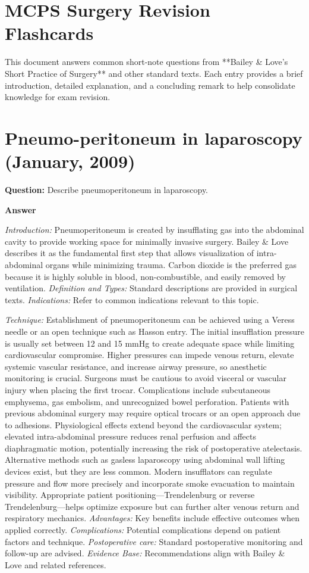 \documentclass{article}
\begin{document}
\section*{MCPS Surgery Revision Flashcards}

This document answers common short-note questions from **Bailey & Love's Short Practice of Surgery** and other standard texts. Each entry provides a brief introduction, detailed explanation, and a concluding remark to help consolidate knowledge for exam revision.


\section{Pneumo-peritoneum in laparoscopy (January, 2009)}

\textbf{Question:} Describe pneumoperitoneum in laparoscopy.

\textbf{Answer}

\emph{Introduction:} Pneumoperitoneum is created by insufflating gas into the abdominal cavity to provide working space for minimally invasive surgery. Bailey & Love describes it as the fundamental first step that allows visualization of intra-abdominal organs while minimizing trauma. Carbon dioxide is the preferred gas because it is highly soluble in blood, non-combustible, and easily removed by ventilation.
\emph{Definition and Types:} Standard descriptions are provided in surgical texts.
\emph{Indications:} Refer to common indications relevant to this topic.

\emph{Technique:} Establishment of pneumoperitoneum can be achieved using a Veress needle or an open technique such as Hasson entry. The initial insufflation pressure is usually set between 12 and 15 mmHg to create adequate space while limiting cardiovascular compromise. Higher pressures can impede venous return, elevate systemic vascular resistance, and increase airway pressure, so anesthetic monitoring is crucial. Surgeons must be cautious to avoid visceral or vascular injury when placing the first trocar. Complications include subcutaneous emphysema, gas embolism, and unrecognized bowel perforation. Patients with previous abdominal surgery may require optical trocars or an open approach due to adhesions. Physiological effects extend beyond the cardiovascular system; elevated intra-abdominal pressure reduces renal perfusion and affects diaphragmatic motion, potentially increasing the risk of postoperative atelectasis. Alternative methods such as gasless laparoscopy using abdominal wall lifting devices exist, but they are less common. Modern insufflators can regulate pressure and flow more precisely and incorporate smoke evacuation to maintain visibility. Appropriate patient positioning—Trendelenburg or reverse Trendelenburg—helps optimize exposure but can further alter venous return and respiratory mechanics.
\emph{Advantages:} Key benefits include effective outcomes when applied correctly.
\emph{Complications:} Potential complications depend on patient factors and technique.
\emph{Postoperative care:} Standard postoperative monitoring and follow-up are advised.
\emph{Evidence Base:} Recommendations align with Bailey & Love and related references.
\end{document}
